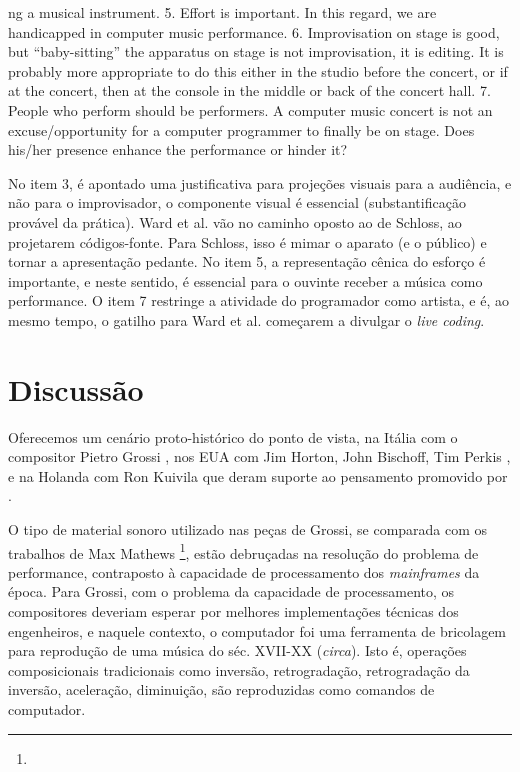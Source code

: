 \begin{citacao}
{ng a musical instrument. 5. Effort is important. In this regard, we are handicapped in computer music performance. 6. Improvisation on stage is good, but “baby-sitting” the apparatus on stage is not improvisation, it is editing. It is probably more appropriate to do this either in the studio before the concert, or if at the concert, then at the console in the middle or back of the concert hall. 7. People who perform should be performers. A computer music concert is not an excuse/opportunity for a computer programmer to finally be on stage. Does his/her presence enhance the performance or hinder it?}
\end{citacao}

No item 3, é apontado uma justificativa para projeções visuais para a audiência, e não para o improvisador, o componente visual é essencial (substantificação provável da prática). Ward et al. vão no caminho oposto ao de Schloss, ao projetarem códigos-fonte. Para Schloss, isso é mimar o aparato (e o público) e tornar a apresentação pedante. No item 5, a representação cênica do esforço é importante, e neste sentido, é essencial para o ouvinte receber a música como performance. O item 7 restringe a atividade do programador como artista, e é, ao mesmo tempo, o gatilho para Ward et al. começarem a divulgar o \emph{live coding}.

\section{Discussão}

Oferecemos um cenário proto-histórico do ponto de vista, na Itália com o compositor Pietro Grossi , nos EUA com Jim Horton, John Bischoff, Tim Perkis , e na Holanda com Ron Kuivila  que deram suporte ao pensamento promovido por .

O tipo de material sonoro utilizado nas peças de Grossi, se comparada com os trabalhos de Max Mathews \footnote{}, estão debruçadas na resolução do problema de performance, contraposto à capacidade de processamento dos \emph{mainframes} da época. Para Grossi, com o problema da capacidade de processamento, os compositores deveriam esperar por melhores implementações técnicas dos engenheiros, e naquele contexto, o computador foi uma ferramenta de bricolagem para reprodução de uma música do séc. XVII-XX (\emph{circa}). Isto é, operações composicionais tradicionais como inversão, retrogradação, retrogradação da inversão, aceleração, diminuição, são reproduzidas como comandos de computador.

